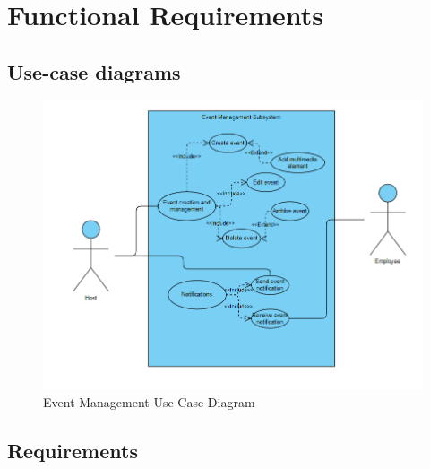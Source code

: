\documentclass[a4paper,12pt]{article}
\begin{document}
\section{Functional Requirements}
\label{sec:functional-requirements}

\subsection{Use-case diagrams}
\label{sec:use-case-diagram}
\begin{figure}[H]
    \centering
    \includegraphics[width=\textwidth]{EventManagementSubsystem.png}
    \caption{Event Management Use Case Diagram}
    \label{fig:use-case-diagram}
\end{figure}

\subsection{Requirements}
\end{document}
